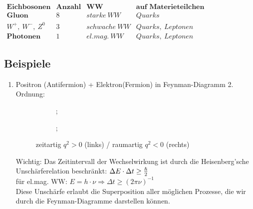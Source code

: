 \documentclass[Ex4_Zusammenfassung.tex]{subfiles}
\begin{document}
	$
	\begin{array}{c|ccc}
		\textbf{Eichbosonen} & \textbf{Anzahl} & \textbf{WW} & \textbf{auf Materieteilchen} \\
		\hline
		\textbf{Gluon} & 8 & starke\ WW & Quarks \\ 
		W^+,\ W^-,\ Z^0 & 3 & schwache\ WW & Quarks,\ Leptonen \\ 
		\textbf{Photonen} & 1 & el.mag.\ WW & Quarks,\ Leptonen
	\end{array} 
	$
	
	\subsection*{Beispiele}
	
	\begin{enumerate}
		\item Positron (Antifermion) + Elektron(Fermion) in Feynman-Diagramm 2. Ordnung:
			\begin{figure}[H]
				\centering
					\quad
				\begin{subfigure}[b]{0.4\textwidth}
					;
				\end{subfigure}
				\quad
				\begin{subfigure}[b]{0.4\textwidth}
					;
				\end{subfigure}
				\caption{zeitartig $q^2 >0$ (links) / raumartig $q^2 < 0$ (rechts)}
			\end{figure}
			Wichtig: Das Zeitintervall der Wechselwirkung ist durch die Heisenberg'sche Unschärferelation beschränkt: $\Delta E \cdot \Delta t \ge \frac{\hslash}{2}$\\
			für el.mag. WW: $E = h \cdot \nu \Rightarrow \Delta t \ge (2\pi \nu)^{-1}$\\
			Diese Unschärfe erlaubt die Superposition aller möglichen Prozesse, die wir durch die Feynman-Diagramme darstellen können.


\end{enumerate}
\end{document}
